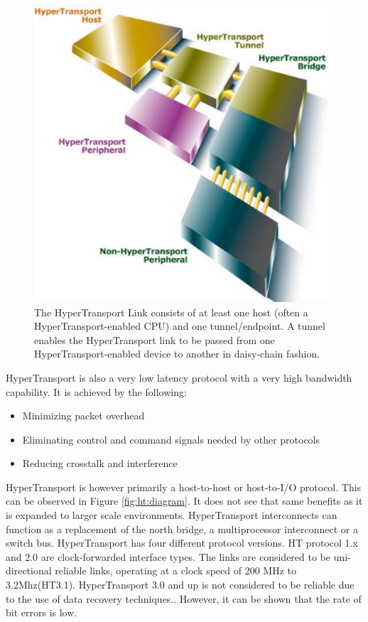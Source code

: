 \documentclass[conference]{IEEEtran}
\begin{document}
\begin{figure}[!t]
	\begin{center}
		\includegraphics[scale=.35]{htLinks}
	\end{center}
	\caption{
	 The HyperTransport Link consists of at least one host (often a
	 HyperTransport-enabled CPU) and one tunnel/endpoint. A tunnel enables the
	 HyperTransport link to be passed from one HyperTransport-enabled device to
	 another in daisy-chain fashion.
	\cite{htWhitePaper}\label{fig:htLinks}}
	\label{fig:ht:packet}
\end{figure}

HyperTransport is also a very low latency protocol with a very high bandwidth
capability. It is achieved by the following:\cite{duato2009extending}

\begin{itemize}
  \item Minimizing packet overhead
  \item Eliminating control and command signals needed by other protocols
  \item Reducing crosstalk and interference
\end{itemize}

HyperTransport is however primarily a host-to-host or host-to-I/O protocol.
This can be observed in Figure \ref{fig:ht:diagram}. It does not see that same
benefits as it is expanded to larger scale environments. HyperTransport interconnects can function as a replacement of the
north bridge,  a multiprocessor interconnect or a switch bus. 
HyperTransport has four different protocol versions. HT protocol 1.x and 2.0
are clock-forwarded interface types. The links are considered to be
uni-directional reliable links, operating at a clock speed of 200 MHz to 3.2Mhz(HT3.1).
HyperTransport 3.0 and up is not considered to be reliable due to the use of
data recovery techniques.\cite{holden2006latency}. However, it can be shown that
the rate of bit errors is low. 
\end{document}
